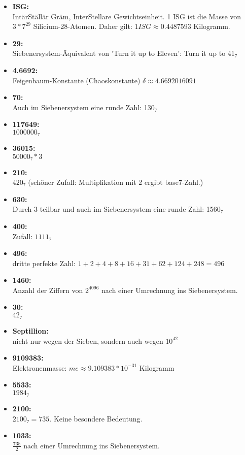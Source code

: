 \begin{itemize}
	\item \textbf{ISG:}\\ IntärStällär Gräm, InterStellare Gewichtseinheit. 1 ISG ist die Masse von $3*7^{29}$ Silicium-28-Atomen. Daher gilt: $1 ISG ≈ 0.4487593$ Kilogramm.
	\item \textbf{29:}\\ Siebenersystem-Äquivalent von 'Turn it up to Eleven': Turn it up to 41₇
	\item \textbf{4.6692:}\\ Feigenbaum-Konstante (Chaoskonstante) $δ ≈ 4.6692016091$
	\item \textbf{70:}\\ Auch im Siebenersystem eine runde Zahl: 130₇
	\item \textbf{117649:}\\ $1000000₇$
	\item \textbf{36015:}\\ $50000₇ * 3$
	\item \textbf{210:}\\ $420₇$ (schöner Zufall: Multiplikation mit 2 ergibt base7-Zahl.)
	\item \textbf{630:}\\ Durch 3 teilbar und auch im Siebenersystem eine runde Zahl: 1560₇
	\item \textbf{400:}\\ Zufall: $1111₇$
	\item \textbf{496:}\\ dritte perfekte Zahl: $1+2+4+8+16+31+62+124+248 = 496$
	\item \textbf{1460:}\\ Anzahl der Ziffern von $2^{4096}$ nach einer Umrechnung ins Siebenersystem.
	\item \textbf{30:}\\ $42₇$
	\item \textbf{Septillion:}\\ nicht nur wegen der Sieben, sondern auch wegen $10^{42}$
	\item \textbf{9109383:}\\ Elektronenmasse: $me ≈ 9.109383*10^{-31}$ Kilogramm
	\item \textbf{5533:}\\ $1984₇$
	\item \textbf{2100:}\\ $2100₇ = 735$. Keine besondere Bedeutung.
	\item \textbf{1033:}\\ $\frac{735}{2}$ nach einer Umrechnung ins Siebenersystem.
\end{itemize}

